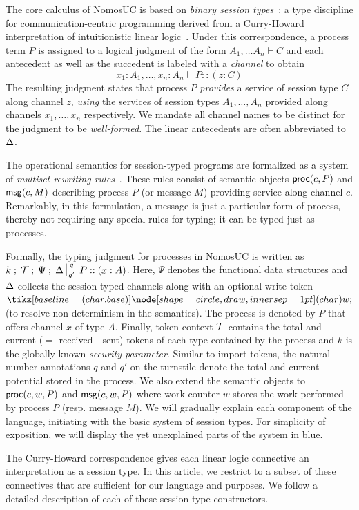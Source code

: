 
The core calculus of NomosUC is based on \emph{binary session types}~\cite{caires2010session}:
a type discipline for communication-centric programming derived from a Curry-Howard interpretation
of intuitionistic linear logic~\cite{girard1987linear}.
Under this correspondence, a process term $P$ is assigned to
a logical judgment of the form $A_1, \ldots A_n \vdash C$ and each antecedent as well as the succedent is
labeled with a \emph{channel} to obtain
\[
x_1 : A_1, \ldots, x_n : A_n \vdash P :: (z : C)
\]
The resulting judgment states that process $P$ \emph{provides} a service
of session type $C$ along channel $z$, \emph{using} the services of session
types $A_1, \ldots, A_n$ provided along channels $x_1, \ldots, x_n$ respectively.
We mandate all channel names to be distinct for the judgment
to be \emph{well-formed}.
The linear antecedents are often abbreviated to $\Delta$.

The operational semantics for session-typed programs are formalized as a
system of \emph{multiset rewriting rules}~\cite{cervesato2009relating}.
These rules consist of semantic objects $\mathsf{proc}(c, P)$ and $\mathsf{msg}(c, M)$ describing
process $P$ (or message $M$) providing service along channel $c$.
Remarkably, in this formulation, a message is just a particular form of process,
thereby not requiring any special rules for typing; it can be typed just as processes.

Formally, the typing judgment for processes in NomosUC is written as
$k \semi \Tokens \semi \Psi \semi \D \entailpot{q}{q'} P :: (x : A)$.
Here, $\Psi$ denotes the functional data structures and $\Delta$ collects the
session-typed channels along with an optional write token $\wt$
(to resolve non-determinism in the semantics).
The process is denoted by $P$ that offers channel $x$ of type $A$.
Finally, token context $\mathcal{T}$ contains the total and current ($=$ received - sent)
tokens of each type contained by the process and $k$ is the globally known \emph{security parameter}.
Similar to import tokens, the natural number annotations $q$ and $q'$ on the turnstile
denote the total and current potential stored in the process.
We also extend the semantic objects to $\mathsf{proc}(c, w, P)$ and $\mathsf{msg}(c, w, P)$
where work counter $w$ stores the work performed by process $P$ (resp.
message $M$).
We will gradually explain each component of the language, initiating
with the basic system of session types.
For simplicity of exposition, we will display the yet unexplained
parts of the system in blue.

The Curry-Howard correspondence gives each linear logic connective an
interpretation as a session type.
In this article, we restrict to a subset of these connectives that
are sufficient for our language and purposes.
We follow a detailed description of each of these session type constructors.

